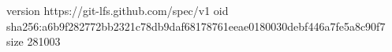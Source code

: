 version https://git-lfs.github.com/spec/v1
oid sha256:a6b9f282772bb2321c78db9daf68178761eeae0180030debf446a7fe5a8c90f7
size 281003
